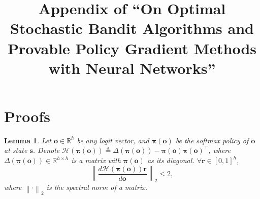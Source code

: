 \documentclass[10pt]{article}
\title{Appendix of ``On Optimal Stochastic Bandit Algorithms and Provable Policy Gradient Methods with Neural Networks''}
\author{}
\date{}
\def\rvo{{\mathbf{o}}}
\def\rvr{{\mathbf{r}}}
\def\rvs{{\mathbf{s}}}
\def\rvo{{\mathbf{o}}}
\newtheorem{lem}{Lemma}
\def\rvpi{{\boldsymbol{\pi}}}
\def\sR{{\mathbb{R}}}
\def\gH{{\mathcal{H}}}
\begin{document}
\maketitle

\appendix

\section{Proofs}

\begin{lem}
    Let $\rvo \in \sR^h$ be any logit vector, and $\rvpi(\rvo)$ be the softmax policy of $\rvo$ at state $\rvs$. Denote $\gH\left( \rvpi \left(\rvo \right) \right) \triangleq \Delta \left( \rvpi \left(\rvo \right) \right) - \rvpi \left(\rvo \right) \rvpi \left(\rvo \right)^\top$, where $\Delta \left( \rvpi \left(\rvo \right) \right) \in \sR^{h \times h}$ is a matrix with $\rvpi \left(\rvo \right)$ as its diagonal. $\forall \rvr \in \left[ 0, 1\right]^h$,
\begin{equation*}
    \left\| \frac{d \gH\left( \rvpi \left(\rvo \right) \right) \rvr}{d \rvo } \right\|_2 \le 2,
\end{equation*}
where $\left\| \cdot \right\|_2$ is the spectral norm of a matrix.
\end{lem}
\end{document}
